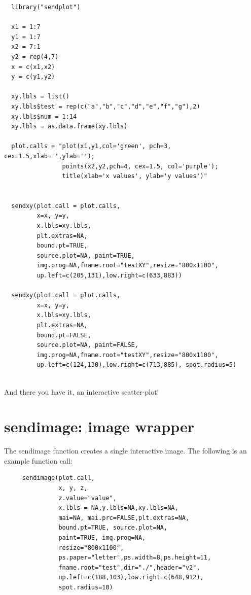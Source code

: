 \documentclass[]{article}
\begin{document}
\begin{verbatim}
  library("sendplot")
	 
  x1 = 1:7
  y1 = 1:7    
  x2 = 7:1
  y2 = rep(4,7)
  x = c(x1,x2)
  y = c(y1,y2)

  xy.lbls = list()
  xy.lbls$test = rep(c("a","b","c","d","e","f","g"),2)
  xy.lbls$num = 1:14
  xy.lbls = as.data.frame(xy.lbls)
	    
  plot.calls = "plot(x1,y1,col='green', pch=3, cex=1.5,xlab='',ylab='');
                points(x2,y2,pch=4, cex=1.5, col='purple');
                title(xlab='x values', ylab='y values')"
   

  sendxy(plot.call = plot.calls, 
         x=x, y=y,
         x.lbls=xy.lbls, 
         plt.extras=NA,
         bound.pt=TRUE, 
         source.plot=NA, paint=TRUE,
         img.prog=NA,fname.root="testXY",resize="800x1100",
         up.left=c(205,131),low.right=c(633,883))

  sendxy(plot.call = plot.calls, 
         x=x, y=y,
         x.lbls=xy.lbls, 
         plt.extras=NA,
         bound.pt=FALSE, 
         source.plot=NA, paint=FALSE,
         img.prog=NA,fname.root="testXY",resize="800x1100",
         up.left=c(124,130),low.right=c(713,885), spot.radius=5)
 
\end{verbatim}


And there you have it, an interactive scatter-plot! 

\newpage



\section{sendimage: image wrapper}

The sendimage function creates a single interactive image. The following is an example function call: 

\begin{verbatim}
     sendimage(plot.call,
               x, y, z,
               z.value="value",
               x.lbls = NA,y.lbls=NA,xy.lbls=NA,
               mai=NA, mai.prc=FALSE,plt.extras=NA,
               bound.pt=TRUE, source.plot=NA,
               paint=TRUE, img.prog=NA,
               resize="800x1100",
               ps.paper="letter",ps.width=8,ps.height=11,
               fname.root="test",dir="./",header="v2",
               up.left=c(188,103),low.right=c(648,912),
               spot.radius=10)
\end{verbatim}
\end{document}

